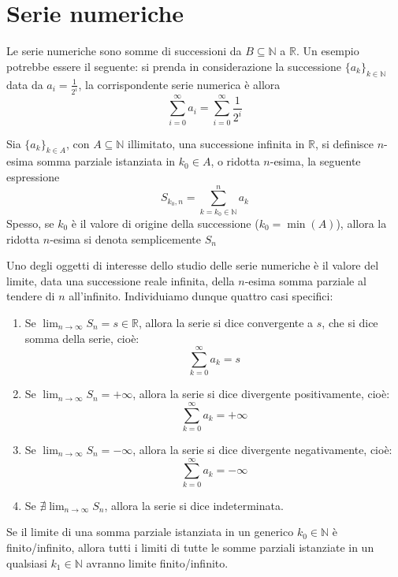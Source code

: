 
\section{Serie numeriche}
        Le serie numeriche sono somme di successioni da $B \subseteq \mathbb{N}$ a $\mathbb{R}$.
        Un esempio potrebbe essere il seguente: si prenda in considerazione la successione $\{a_{k}\}_{k \in \mathbb{N}}$ data da $a_{i} = \displaystyle \frac{1}{2^{i}}$, la corrispondente serie numerica è allora
        \[
            \sum_{i = 0}^{\infty} a_{i} = \sum_{i = 0}^{\infty} \frac{1}{2^{i}}
        \]

        \begin{definition}
            Sia $\{a_{k}\}_{k \in A}$, con $A \subseteq \mathbb{N}$ illimitato, una successione infinita in $\mathbb{R}$, si definisce $n$-esima somma parziale istanziata in $k_{0} \in A$, o ridotta $n$-esima, la seguente espressione
            \[
                S_{k_{0}, n} = \sum_{k = k_{0} \in \mathbb{N}}^{n} a_{k}
            \]
            Spesso, se $k_{0}$ è il valore di origine della successione ($k_{0} = \min(A)$), allora la ridotta $n$-esima si denota semplicemente $S_{n}$
        \end{definition}

        Uno degli oggetti di interesse dello studio delle serie numeriche è il valore del limite, data una successione reale infinita, della $n$-esima somma parziale al tendere di $n$ all'infinito.
        Individuiamo dunque quattro casi specifici:
        \begin{enumerate}[label=(\arabic*)]
            \item Se $\displaystyle \lim_{n \rightarrow \infty} S_{n} = s \in \mathbb{R}$, allora la serie si dice convergente a $s$, che si dice somma della serie, cioè:
            \[
                \sum_{k = 0}^{\infty} a_{k} = s
            \]
            \item Se $\displaystyle \lim_{n \rightarrow \infty} S_{n} = +\infty$, allora la serie si dice divergente positivamente, cioè:
            \[
                \sum_{k = 0}^{\infty} a_{k} = +\infty
            \]
            \item Se $\displaystyle \lim_{n \rightarrow \infty} S_{n} = -\infty$, allora la serie si dice divergente negativamente, cioè:
            \[
                \sum_{k = 0}^{\infty} a_{k} = -\infty
            \]
            \item Se $\displaystyle \nexists \lim_{n \rightarrow \infty} S_{n}$, allora la serie si dice indeterminata.
        \end{enumerate}
        Se il limite di una somma parziale istanziata in un generico $k_{0} \in \mathbb{N}$ è finito/infinito, allora tutti i limiti di tutte le somme parziali istanziate in un qualsiasi $k_{1} \in \mathbb{N}$ avranno limite finito/infinito.

